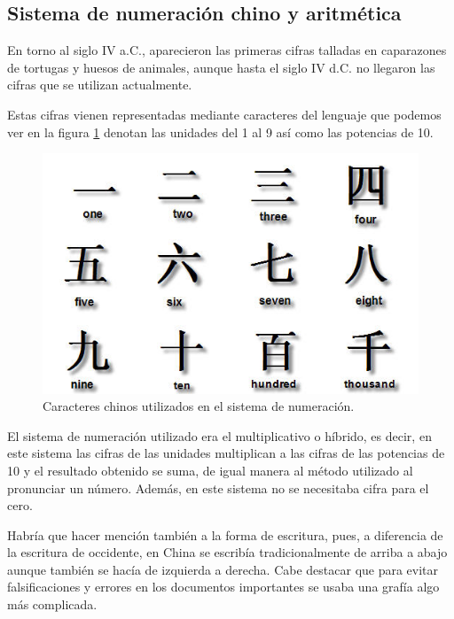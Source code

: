 \documentclass[a4paper, 11pt]{article}
\begin{document}
	\subsection{Sistema de numeración chino y aritmética}
		En torno al siglo IV a.C., aparecieron las primeras cifras talladas en caparazones de tortugas y huesos de animales,
		aunque hasta el siglo IV d.C. no llegaron las cifras que se utilizan actualmente.
		
		Estas cifras vienen representadas mediante caracteres del lenguaje que podemos ver en la figura \ref{fig:ch_numbers}
		denotan las unidades del 1 al 9 así como las potencias de 10.
		
		\begin{figure}[!ht]
			\centering
			\includegraphics[width = 14cm]{chinese_numbers.jpg}
			\caption{Caracteres chinos utilizados en el sistema de numeración.}
			\label{fig:ch_numbers}
		\end{figure}
				
		El sistema de numeración utilizado era el multiplicativo o híbrido, es decir, en este sistema las cifras de las
		unidades multiplican a las cifras de las potencias de 10 y el resultado obtenido se suma, de igual manera al método
		utilizado al pronunciar un número. Además, en este sistema no se necesitaba cifra para el cero.
		
		Habría que hacer mención también a la forma de escritura, pues, a diferencia de la escritura de occidente, en
		China se escribía tradicionalmente de arriba a abajo aunque también se hacía de izquierda a derecha. Cabe destacar
		que para evitar falsificaciones y errores en los documentos importantes se usaba una grafía algo más complicada.
	
\end{document}
